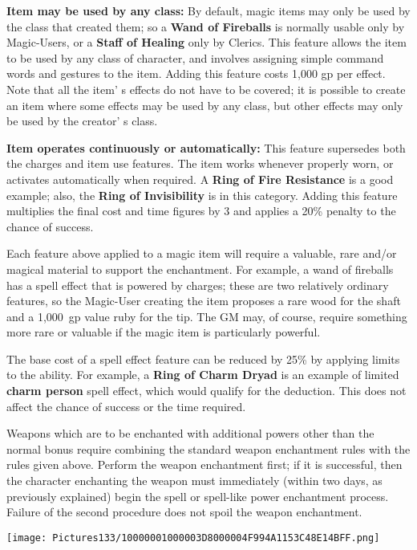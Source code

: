 \documentclass[a4paper,twoside,openany,10pt]{book}
\begin{document}
\begin{multicols}{2}
\textbf{Item may be used by any class:} By default, magic items may only be used by the class that created them; so a \textbf{Wand of Fireballs} is normally usable only by Magic-Users, or a \textbf{Staff of Healing} only by Clerics. This feature allows the item to be used by any class of character, and involves assigning simple command words and gestures to the item. Adding this feature costs 1,000 gp per effect. Note that all the item' s effects do not have to be covered; it is possible to create an item where some effects may be used by any class, but other effects may only be used by the creator' s class.


\textbf{Item operates continuously or automatically:} This feature supersedes both the charges and item use features. The item works whenever properly worn, or activates automatically when required. A \textbf{Ring of Fire Resistance} is a good example; also, the \textbf{Ring of Invisibility} is in this category. Adding this feature multiplies the final cost and time figures by 3 and applies a 20\% penalty to the chance of success. 

Each feature above applied to a magic item will require a valuable, rare and/or magical material to support the enchantment. For example, a wand of fireballs has a spell effect that is powered by charges; these are two relatively ordinary features, so the Magic-User creating the item proposes a rare wood for the shaft and a 1,000~gp value ruby for the tip. The GM may, of course, require something more rare or valuable if the magic item is particularly powerful.

The base cost of a spell effect feature can be reduced by 25\% by applying limits to the ability. For example, a \textbf{Ring of Charm Dryad} is an example of limited \textbf{charm person} spell effect, which would qualify for the deduction. This does not affect the chance of success or the time required.

Weapons which are to be enchanted with additional powers other than the normal bonus require combining the standard weapon enchantment rules with the rules given above. Perform the weapon enchantment first; if it is successful, then the character enchanting the weapon must immediately (within two days, as previously explained) begin the spell or spell-like power enchantment process. Failure of the second procedure does not spoil the weapon enchantment.


\begin{center}
	\texttt{[image: Pictures133/10000001000003D8000004F994A1153C48E14BFF.png]}
\end{center}


\end{multicols}
\end{document}

